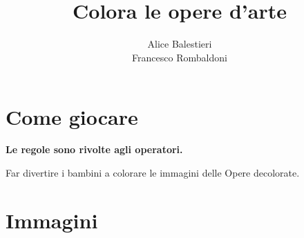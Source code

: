 \documentclass[hidelinks,12pt,a4paper]{article}
\begin{document}
	
	\title{\textbf{\\Colora le opere d'arte}}
	\author{Alice Balestieri\\Francesco Rombaldoni}
	\date{}
	
	\maketitle
	\newpage
	
	\tableofcontents
	\newpage
	
	\section{Come giocare}
	\begin{center}
		\textbf{Le regole sono rivolte agli operatori.}
	\end{center}
	
	Far divertire i bambini a colorare le immagini delle Opere decolorate.
	
	\section{Immagini}
	\newpage
	
\end{document}
